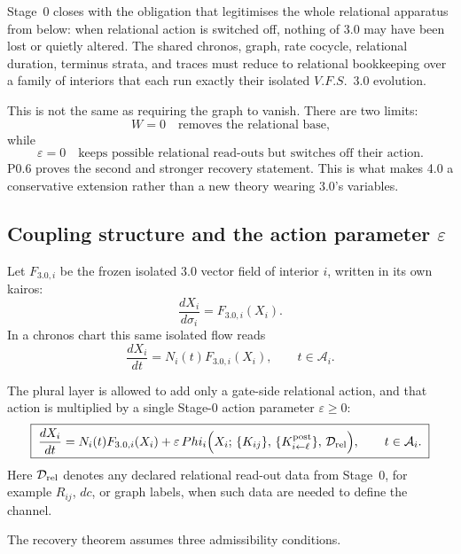 \documentclass[11pt,a4paper]{article}
\def\Phi{Phi}%
\def\mathfrak#1{#1}%
\def\mathrm#1{#1}%
\def\emph#1{#1}%
\newcommand{\VFS}{\ensuremath{\mathrm{V.F.S.}}}
\theoremstyle{definition}
\theoremstyle{plain}
\theoremstyle{remark}
\begin{document}
Stage~0 closes with the obligation that legitimises the whole relational apparatus
from below: when relational action is switched off, nothing of 3.0 may have been
lost or quietly altered. The shared chronos, graph, rate cocycle, relational
duration, terminus strata, and traces must reduce to relational bookkeeping over
a family of interiors that each run \emph{exactly} their isolated \VFS\ 3.0
evolution.

This is not the same as requiring the graph to vanish. There are two limits:
\[
W=0
\quad
\text{removes the relational base,}
\]
while
\[
\varepsilon=0
\quad
\text{keeps possible relational read-outs but switches off their action.}
\]
P0.6 proves the second and stronger recovery statement. This is what makes 4.0 a
\emph{conservative extension} rather than a new theory wearing 3.0's variables.

\subsection{Coupling structure and the action parameter
\texorpdfstring{\(\varepsilon\)}{epsilon}}

Let \(F_{3.0,i}\) be the frozen isolated 3.0 vector field of interior \(i\), written
in its own kairos:
\[
\frac{dX_i}{d\sigma_i}
=
F_{3.0,i}(X_i).
\]
In a chronos chart this same isolated flow reads
\[
\frac{dX_i}{dt}
=
N_i(t)F_{3.0,i}(X_i),
\qquad
t\in\mathcal A_i.
\]

The plural layer is allowed to add only a gate-side relational action, and that
action is multiplied by a single Stage-0 action parameter \(\varepsilon\ge0\):
\[
\boxed{\;
\frac{dX_i}{dt}
=
N_i(t)F_{3.0,i}(X_i)
+
\varepsilon\,
\Phi_i
\Bigl(
X_i;\,
\{K_{ij}\},\,
\{K^{\rm post}_{i\leftarrow\ell}\},\,
\mathcal D_{\rm rel}
\Bigr),
\qquad
t\in\mathcal A_i.
\;}
\]
Here \(\mathcal D_{\rm rel}\) denotes any declared relational read-out data from
Stage~0, for example \(R_{ij}\), \(d\mathfrak c\), or graph labels, when such data
are needed to define the channel.

The recovery theorem assumes three admissibility conditions.
\end{document}
